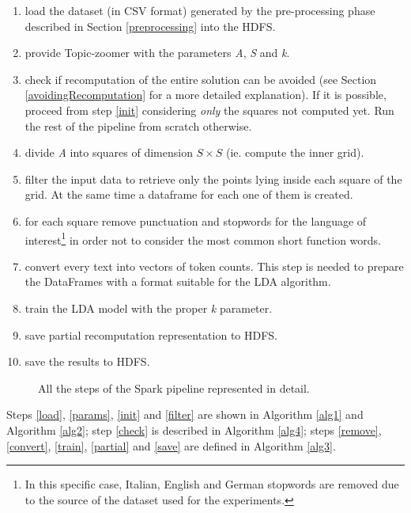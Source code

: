 \documentclass{sig-alternate-05-2015}
\begin{document}
\begin{enumerate}
    \item \label{load} load the dataset (in CSV format) generated by the pre-processing phase described in Section \ref{preprocessing} into the HDFS.
    \item \label{params} provide Topic-zoomer with the parameters \emph{A}, \emph{S} and \emph{k}.
    \item \label{check} check if recomputation of the entire solution can be avoided (see Section \ref{avoidingRecomputation} for a more detailed explanation). If it is possible, proceed from step \ref{init} considering \emph{only} the squares not computed yet. Run the rest of the pipeline from scratch otherwise.
    \item \label{init} divide \emph{A} into squares of dimension $S \times S$ (ie. compute the inner grid).
    \item \label{filter} filter the input data to retrieve only the points lying inside each square of the grid. At the same time a dataframe for each one of them is created.
    \item \label{remove} for each square remove punctuation and stopwords\cite{mmd} for the language of interest\footnote{In this specific case, Italian, English and German stopwords are removed due to the source of the dataset used for the experiments.} in order not to consider the most common short function words.
    \item \label{convert} convert every text into vectors of token counts. This step is needed to prepare the DataFrames with a format suitable for the LDA algorithm.
    \item \label{train} train the LDA model with the proper \emph{k} parameter.
    \item \label{partial} save partial recomputation representation to HDFS.
    \item \label{save} save the results to HDFS.
\end{enumerate}

\begin{figure}
  \caption{All the steps of the Spark pipeline represented in detail.}
  \label{spark_pipeline}
\end{figure}

Steps \ref{load}, \ref{params}, \ref{init} and \ref{filter} are shown in Algorithm \ref{alg1} and Algorithm \ref{alg2}; step \ref{check} is described in Algorithm \ref{alg4}; steps \ref{remove}, \ref{convert}, \ref{train}, \ref{partial} and \ref{save} are defined in Algorithm \ref{alg3}.\\
\end{document}
